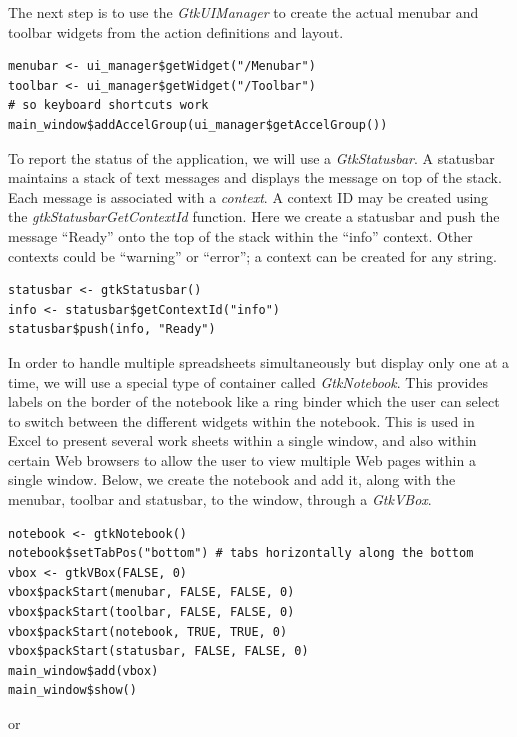 \documentclass[article]{jss}
\begin{document}
The next step is to use the \emph{GtkUIManager} to create the actual menubar and toolbar widgets from the action definitions and layout.
\begin{verbatim}
menubar <- ui_manager$getWidget("/Menubar")
toolbar <- ui_manager$getWidget("/Toolbar")
# so keyboard shortcuts work
main_window$addAccelGroup(ui_manager$getAccelGroup()) 
\end{verbatim}

To report the status of the application, we will use a
\emph{GtkStatusbar}. 
A statusbar maintains a stack of text messages and displays the
message
on top of the stack. Each message is associated with a \emph{context}.
A context
ID may be created using the \emph{gtkStatusbarGetContextId} function.
Here we create a 
statusbar and push the message ``Ready'' onto the top of the stack
within
the ``info'' context. Other contexts could be ``warning'' or
``error''; a context
can be created for any string.
\begin{verbatim}
statusbar <- gtkStatusbar()
info <- statusbar$getContextId("info")
statusbar$push(info, "Ready") 
\end{verbatim}
In order to handle multiple spreadsheets simultaneously but display
only one at a time, we will use a special type of container called
\emph{GtkNotebook}.  This provides labels on the border of the
notebook like a ring binder which the user can select to switch
between the different widgets within the notebook.  This is used in
Excel to present several work sheets within a single window, and also
within certain Web browsers to allow the user to view multiple Web
pages within a single window. Below, we create the notebook and add
it, along with the menubar, toolbar and statusbar, to the window,
through a \emph{GtkVBox}.
\begin{verbatim}
notebook <- gtkNotebook()
notebook$setTabPos("bottom") # tabs horizontally along the bottom
vbox <- gtkVBox(FALSE, 0)
vbox$packStart(menubar, FALSE, FALSE, 0)
vbox$packStart(toolbar, FALSE, FALSE, 0)
vbox$packStart(notebook, TRUE, TRUE, 0)
vbox$packStart(statusbar, FALSE, FALSE, 0)
main_window$add(vbox)
main_window$show()
\end{verbatim}
%
or 
\end{document}
